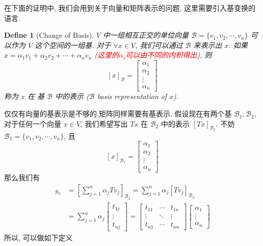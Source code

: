 \documentclass{article}
\newtheorem{define}{Define}
\begin{document}
在下面的证明中, 我们会用到关于向量和矩阵表示的问题, 这里需要引入基变换的语言.
\begin{define}[Change of Basis]
  $V$ 中一组相互正交的单位向量 $\mathcal{B} = \{v_1, v_2, \cdots, v_n\}$ 可以作为 $V$ 这个空间的一组基.
  对于 $\forall x\in V$, 我们可以通过 $\mathcal{B}$ 来表示出 $x$.
  如果 $x = \alpha_1v_1 + \alpha_2v_2 + \cdots + \alpha_nv_n$ (\textcolor{red}{这里的$\alpha_i$可以由不同的内积得出}), 则
  \[[x]_{\mathcal{B}} = \left[
      \begin{array}{c}
        \alpha_1 \\
        \alpha_2 \\
        \vdots \\
        \alpha_n
      \end{array}
    \right]\]
  称为 $x$ 在 基 $\mathcal{B}$ 中的表示 ($\mathcal{B}$ basis representation of $x$).
\end{define}

仅仅有向量的基表示是不够的,矩阵同样需要有基表示.
假设现在有两个基 $\mathcal{B}_1, \mathcal{B}_2$, 对于任何一个向量 $x\in V$,
我们希望写出 $Tx$ 在 $\mathcal{B}_2$ 中的表示 $[Tx]_{\mathcal{B}_2}$.
不妨 $\mathcal{B}_1 = \{v_1, v_2, \cdots, v_n\}$, 且
\[[x]_{\mathcal{B}_1} = \left[
    \begin{array}{c}
      \alpha_1 \\
      \alpha_2 \\
      \vdots \\
      \alpha_n
    \end{array}
  \right]\]
那么我们有
\begin{align*}
  [Tx]_{\mathcal{B}_2} &= \left[\sum_{j=1}^n \alpha_jTv_j\right]_{\mathcal{B}_2} = \sum_{j=1}^n \alpha_j[Tv_j]_{\mathcal{B}_2}\\
    &= \sum_{j=1}^n \alpha_j \left[
        \begin{array}{c}
        t_{1j}\\
        \vdots \\
        t_{nj}
        \end{array}
  \right] = \left[
  \begin{array}{ccc}
    t_{11}&\cdots& t_{1n} \\
    \vdots & \ddots & \vdots \\
    t_{n1} & \cdots & t_{nn}
  \end{array}
  \right]\left[
    \begin{array}{c}
      \alpha_1 \\
      \vdots \\
      \alpha_n
    \end{array}
  \right]
\end{align*}
所以, 可以做如下定义
\end{document}
